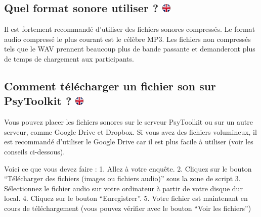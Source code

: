 \documentclass[
]{book}
\begin{document}
\hypertarget{quel-format-sonore-utiliser}{%
\subsection[Quel format sonore utiliser ? ]{\texorpdfstring{Quel format sonore utiliser ? \href{https://www.psytoolkit.org/lessons/surveyaudiovideo.html\#_what_sound_format_to_use}{\protect\includegraphics{img/ukflag.png}}}{Quel format sonore utiliser ? }}\label{quel-format-sonore-utiliser}}

Il est fortement recommandé d'utiliser des fichiers sonores compressés. Le format audio compressé le plus courant est le célèbre MP3. Les fichiers non compressés tels que le WAV prennent beaucoup plus de bande passante et demanderont plus de temps de chargement aux participants.

\hypertarget{comment-tuxe9luxe9charger-un-fichier-son-sur-psytoolkit}{%
\subsection[Comment télécharger un fichier son sur PsyToolkit ? ]{\texorpdfstring{Comment télécharger un fichier son sur PsyToolkit ? \href{https://www.psytoolkit.org/lessons/surveyaudiovideo.html\#_how_to_upload_a_sound_file_to_psytoolkit}{\protect\includegraphics{img/ukflag.png}}}{Comment télécharger un fichier son sur PsyToolkit ? }}\label{comment-tuxe9luxe9charger-un-fichier-son-sur-psytoolkit}}

Vous pouvez placer les fichiers sonores sur le serveur PsyToolkit ou sur un autre serveur, comme Google Drive et Dropbox. Si vous avez des fichiers volumineux, il est recommandé d'utiliser le Google Drive car il est plus facile à utiliser (voir les conseils ci-dessous).

Voici ce que vous devez faire :
1. Allez à votre enquête.
2. Cliquez sur le bouton ``Télécharger des fichiers (images ou fichiers audio)'' sous la zone de script
3. Sélectionnez le fichier audio sur votre ordinateur à partir de votre disque dur local.
4. Cliquez sur le bouton ``Enregistrer''.
5. Votre fichier est maintenant en cours de téléchargement (vous pouvez vérifier avec le bouton ``Voir les fichiers'')
\end{document}
